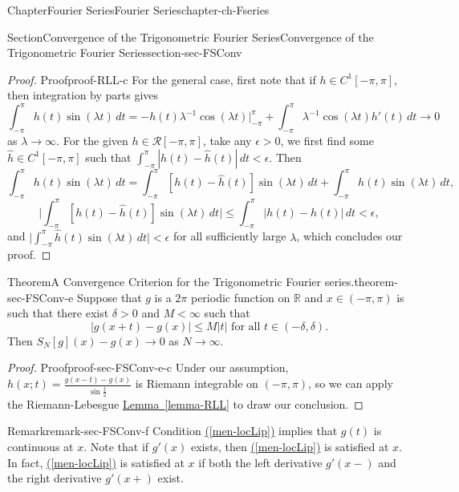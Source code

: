 \documentclass[oneside,10pt,]{book}
\newcommand{\xreffont}{\relax}
\numberwithin{equation}{section}
\newcommand{\bbR}{\mathbb{R}}
\newcommand{\cR}{\mathcal{R}}
\newcommand{\lt}{<}
\newcommand{\gt}{>}
\begin{document}
\begin{chapterptx}{Chapter}{Fourier Series}{}{Fourier Series}{}{}{chapter-ch-Fseries}
\begin{sectionptx}{Section}{Convergence of the Trigonometric Fourier Series}{}{Convergence of the Trigonometric Fourier Series}{}{}{section-sec-FSConv}
\begin{proof}{Proof}{}{proof-RLL-c}
For the general case, first note that if \(h\in C^{1}[-\pi, \pi]\), then integration by parts gives%
\begin{equation*}
\int_{-\pi}^{\pi} h(t)\sin(\lambda t)\, dt= - h(t)\lambda^{-1} \cos (\lambda t) \Big|_{-\pi}^{\pi} +
\int_{-\pi}^{\pi} \lambda^{-1} \cos (\lambda t) h'(t)\, dt \to 0
\end{equation*}
as \(\lambda \to \infty\). For the given \(h\in \cR[-\pi, \pi]\), take any \(\epsilon \gt 0\), we first find some \(\hat h \in C^{1}[-\pi, \pi]\) such that \(\int_{-\pi}^{\pi} |h(t)-\hat h(t)|\, dt \lt \epsilon\). Then%
\begin{equation*}
\int_{-\pi}^{\pi} h(t)\sin(\lambda t)\, dt= \int_{-\pi}^{\pi} [h(t)-\hat h(t)]\sin(\lambda t)\, dt + 
\int_{-\pi}^{\pi} \hat h(t)\sin(\lambda t)\, dt,
\end{equation*}
%
\begin{equation*}
\vert \int_{-\pi}^{\pi} [h(t)-\hat h(t)]\sin(\lambda t)\, dt\vert \le \int_{-\pi}^{\pi} \vert h(t)-\hat h(t)\vert \, dt \lt \epsilon,
\end{equation*}
and \(\vert \int_{-\pi}^{\pi} \hat h(t)\sin(\lambda t)\, dt \vert \lt \epsilon\) for all sufficiently large \(\lambda\), which concludes our proof.%
\end{proof}
\begin{theorem}{Theorem}{A Convergence Criterion for the Trigonometric Fourier series.}{}{theorem-sec-FSConv-e}%
Suppose that \(g\) is a \(2\pi\) periodic function on \(\bbR\) and \(x\in (-\pi, \pi)\) is such that  there exist \(\delta>0\) and \(M < \infty\) such that%
\begin{equation}
|g(x+t)-g(x)|\le M |t| \text{   for all } t\in (-\delta, \delta).\label{men-locLip}
\end{equation}
Then \(S_N[g]( x)-g(x)\to 0\) as \(N\to\infty\).\end{theorem}
\begin{proof}{Proof}{}{proof-sec-FSConv-e-c}
Under our assumption, \(h(x; t)=\frac{g(x-t) -g(x)}{\sin \frac t2}\) is Riemann integrable on \((-\pi, \pi)\), so we can apply the Riemann-Lebesgue  \hyperref[lemma-RLL]{Lemma~{\xreffont\ref{lemma-RLL}}} to draw our conclusion.\end{proof}
\begin{remark}{Remark}{}{remark-sec-FSConv-f}%
Condition \hyperref[men-locLip]{({\xreffont\ref{men-locLip}})} implies that \(g(t)\) is continuous at \(x\).  Note that if \(g'(x)\) exists, then \hyperref[men-locLip]{({\xreffont\ref{men-locLip}})} is satisfied at \(x\). In fact, \hyperref[men-locLip]{({\xreffont\ref{men-locLip}})} is satisfied at \(x\) if both the left derivative \(g'(x-)\) and the right derivative \(g'(x+)\) exist.%

\end{remark}
\end{sectionptx}
\end{chapterptx}
\end{document}
